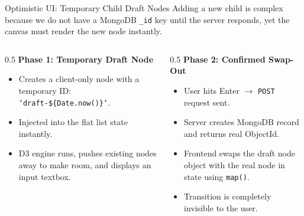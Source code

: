 \documentclass[aspectratio=169, 10pt]{beamer}
\begin{document}
\begin{frame}[fragile]{Optimistic UI: Temporary Child Draft Nodes}
  Adding a new child is complex because we do not have a MongoDB \texttt{\_id} key until the server responds, yet the canvas must render the new node instantly.
  \vspace{0.4em}
  \begin{columns}
    \begin{column}{0.5\textwidth}
      \textbf{Phase 1: Temporary Draft Node}
      \begin{itemize}
        \item Creates a client-only node with a temporary ID: \texttt{`draft-\$\{Date.now()\}`}.
        \item Injected into the flat list state instantly.
        \item D3 engine runs, pushes existing nodes away to make room, and displays an input textbox.
      \end{itemize}
    \end{column}
    \begin{column}{0.5\textwidth}
      \textbf{Phase 2: Confirmed Swap-Out}
      \begin{itemize}
        \item User hits Enter $\rightarrow$ \texttt{POST} request sent.
        \item Server creates MongoDB record and returns real ObjectId.
        \item Frontend swaps the draft node object with the real node in state using \texttt{map()}.
        \item Transition is completely invisible to the user.
      \end{itemize}
    \end{column}
  \end{columns}
\end{frame}
\end{document}
